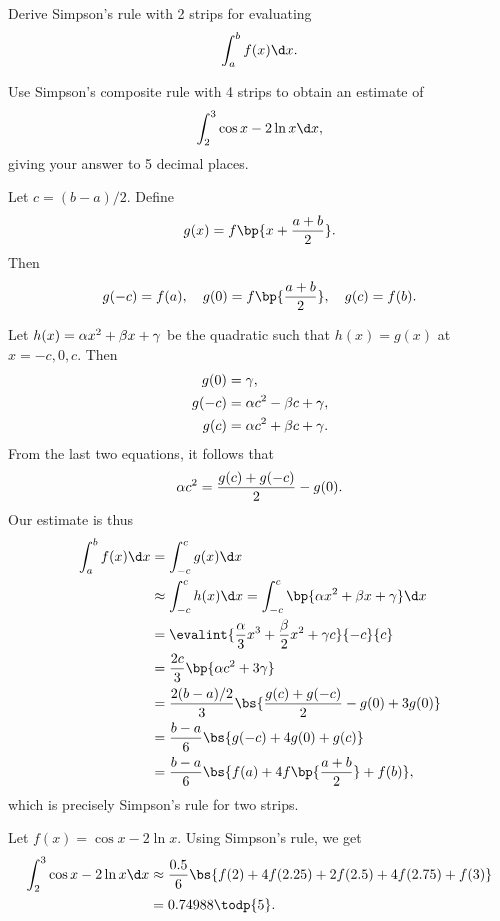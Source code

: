 \begin{problem}
    Derive Simpson's rule with 2 strips for evaluating \[\int_{a}^{b} f(x) \d x.\]
    
    Use Simpson's composite rule with 4 strips to obtain an estimate of \[\int_{2}^{3} \cos{x - 2} \ln x \d x,\] giving your answer to 5 decimal places.
\end{problem}
\begin{solution}
    Let $c = (b-a)/2$. Define \[g(x) = f\bp{x + \frac{a+b}{2}}.\] Then \[g(-c) = f(a), \quad g(0) = f\bp{\frac{a+b}{2}}, \quad g(c) = f(b).\]

    Let $h(x) = \alpha x^2 + \beta x + \gamma$ be the quadratic such that $h(x) = g(x)$ at $x = -c, 0, c$. Then 
    \begin{align*}
        g(0) &= \gamma,\\
        g(-c) &= \alpha c^2 - \beta c + \gamma,\\
        g(c) &= \alpha c^2 + \beta c + \gamma.
    \end{align*}
    From the last two equations, it follows that \[\alpha c^2 = \frac{g(c) + g(-c)}{2} - g(0).\] Our estimate is thus
    \begin{align*}
        \int_a^b f(x) \d x &= \int_{-c}^c g(x) \d x\\
        &\approx \int_{-c}^c h(x) \d x = \int_{-c}^c \bp{\a x^2 + \b x + \g} \d x\\
        &= \evalint{\frac\a3 x^3 + \frac\b2 x^2 + \g c}{-c}{c}\\
        &= \frac{2c}{3} \bp{\a c^2 + 3\g}\\
        &= \frac{2(b-a)/2}{3} \bs{\frac{g(c) + g(-c)}{2} - g(0) + 3g(0)}\\
        &= \frac{b-a}{6} \bs{g(-c) + 4g(0) + g(c)}\\
        &= \frac{b-a}{6} \bs{f(a) + 4f\bp{\frac{a+b}{2}} + f(b)},
    \end{align*}
    which is precisely Simpson's rule for two strips.

    Let $f(x) = \cos{x-2} \ln x$. Using Simpson's rule, we get
    \begin{align*}
        \int_2^3 \cos{x-2}\ln x \d x &\approx \frac{0.5}{6} \bs{f(2) + 4f(2.25) + 2f(2.5) + 4f(2.75) + f(3)}\\
        &= 0.74988 \todp{5}.
    \end{align*}
\end{solution}

